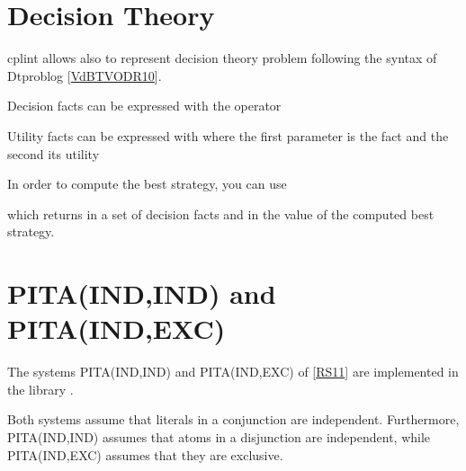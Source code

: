 \documentclass[letterpaper,10pt,english]{sphinxmanual}
\begin{document}
\section{Decision Theory}
\label{\detokenize{index:decision-theory}}
\sphinxAtStartPar
cplint allows also to represent decision theory problem following the syntax of Dtproblog {[}\hyperlink{cite.index:id69}{VdBTVODR10}{]}.

\sphinxAtStartPar
Decision facts can be expressed with the operator 

\begin{sphinxVerbatim}[commandchars=\\\{\}]
  
\end{sphinxVerbatim}

\sphinxAtStartPar
Utility facts can be expressed with  where the first parameter is the fact and the second its utility

\begin{sphinxVerbatim}[commandchars=\\\{\}]
\end{sphinxVerbatim}

\sphinxAtStartPar
In order to compute the best strategy, you can use 

\begin{sphinxVerbatim}[commandchars=\\\{\}]
\end{sphinxVerbatim}

\sphinxAtStartPar
which returns in  a set of decision facts and in  the value of the computed best strategy.


\section{PITA(IND,IND) and PITA(IND,EXC)}
\label{\detokenize{index:pita-ind-ind-and-pita-ind-exc}}
\sphinxAtStartPar
The systems PITA(IND,IND) and PITA(IND,EXC) of {[}\hyperlink{cite.index:id70}{RS11}{]} are
implemented in the library .

\sphinxAtStartPar
Both systems assume that literals in a conjunction are independent.
Furthermore, PITA(IND,IND) assumes that atoms in a disjunction are independent,
while PITA(IND,EXC) assumes that they are exclusive.
\end{document}
